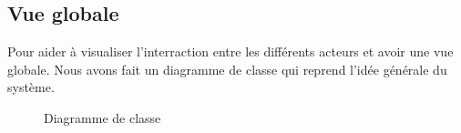 \documentclass[../design_fonctionnement_sys.tex]{subfiles}
\begin{document}
\subsection{Vue globale}
Pour aider à visualiser l'interraction entre les différents acteurs et avoir une vue globale. Nous avons fait un diagramme de classe
qui reprend l'idée générale du système.
\newpage
\begin{figure}[H]
    \centering
    \label{fig:dia_class}
    \caption{Diagramme de classe}
\end{figure}
\end{document}
